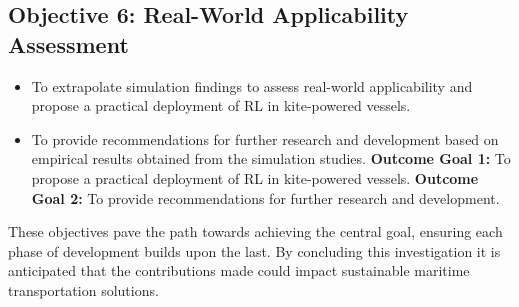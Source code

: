 \subsection*{Objective 6: Real-World Applicability Assessment}
\begin{itemize}
    \item To extrapolate simulation findings to assess real-world applicability and propose a  practical deployment of RL in kite-powered vessels.
    \item To provide recommendations for further research and development based on empirical results obtained from the simulation studies.
    \newline\textbf{Outcome Goal 1:} To propose a practical deployment of RL in kite-powered vessels.
    \newline\textbf{Outcome Goal 2:} To provide recommendations for further research and development.
\end{itemize}

These objectives pave the path towards achieving the central goal, ensuring each phase of development builds upon the last. By concluding this investigation it is anticipated that the contributions made could impact sustainable maritime transportation solutions.



